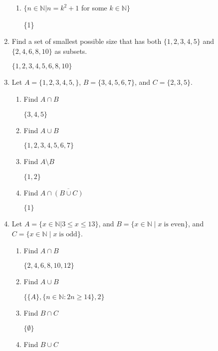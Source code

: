 \documentclass[11pt, a4paper]{article}
\newcommand\setItemNumber[1]{\setcounter{enumi}{\numexpr#1-1\relax}}
\begin{document}
\begin{enumerate}
\begin{enumerate}
            \item $\{n \in\mathbb{N}| n = k^2 +1$ for some $k\in\mathbb{N}\}$

                \{1\}

        \end{enumerate}

    \setItemNumber{5}
    \item Find a set of smallest possible size that has both $\{1,2,3,4,5\}$ and $\{2,4,6,8,10\}$ as subsets.

        $\{1,2,3,4,5,6,8,10\}$

    \setItemNumber{8}
    \item Let $A = \{1,2,3,4,5,\}$, $B = \{3,4,5,6,7\}$, and $C = \{2,3,5\}$.
        \begin{enumerate}
            \item Find $A\cap B$

                $\{3,4,5\}$

            \item Find $A\cup B$

                $\{1,2,3,4,5,6,7\}$

            \item Find $A\setminus B$

                $\{1,2\}$

            \item Find $A\cap\overline{(B\cup C)}$

                $\{1\}$

        \end{enumerate}

    \setItemNumber{10}
\item Let $A = \{x\in\mathbb{N}| 3\leq x\leq13\}$, and $B = \{x\in\mathbb{N}\;|\;x\; \text{is even}\}$, and $C = \{x\in\mathbb{N}\;|\;x\; \text{is odd}\}$.
        \begin{enumerate}
            \item Find $A\cap B$

                $\{2,4,6,8,10,12\}$

            \item Find $A\cup B$

                $\{\{A\},\{n\in\mathbb{N}:2n \geq 14\}, 2\}$

            \item Find $B\cap C$

                $\{\emptyset\}$

            \item Find $B\cup C$


\end{enumerate}
\end{enumerate}
\end{document}
